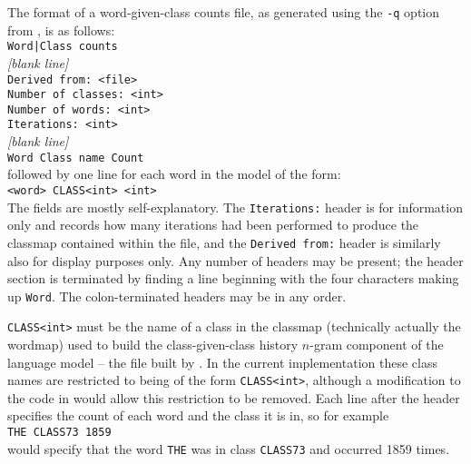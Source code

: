 The format of a word-given-class counts file, as generated using the
\texttt{-q} option from , is as follows:\\
\texttt{Word|Class counts}\\
\textit{[blank line]}\\
\texttt{Derived from: <file>}\\
\texttt{Number of classes: <int>}\\
\texttt{Number of words: <int>}\\
\texttt{Iterations: <int>}\\
\textit{[blank line]}\\
\texttt{Word    Class name   Count}\\
followed by one line for each word in the model of the form:\\
\texttt{<word> CLASS<int> <int>}\\

The fields are mostly self-explanatory.  The {\tt Iterations:} header
is for information only and records how many iterations had been
performed to produce the classmap contained within the file, and the
{\tt Derived from:} header is similarly also for display purposes
only.  Any number of headers may be present; the header section is
terminated by finding a line beginning with the four characters making
up {\tt Word}. The colon-terminated headers may be in any order.

{\tt CLASS<int>} must be the name of a class in the classmap
(technically actually the wordmap) used to build the class-given-class
history $n$-gram component of the language model -- the file built by
.  In the current implementation these class names are
restricted to being of the form {\tt CLASS<int>}, although a
modification to the code in  would allow this
restriction to be removed.  Each line after the header specifies the
count of each word and the class it is in, so for example\\
\texttt{THE CLASS73 1859}\\
would specify that the word {\tt THE} was in class {\tt CLASS73} and
occurred 1859 times.


